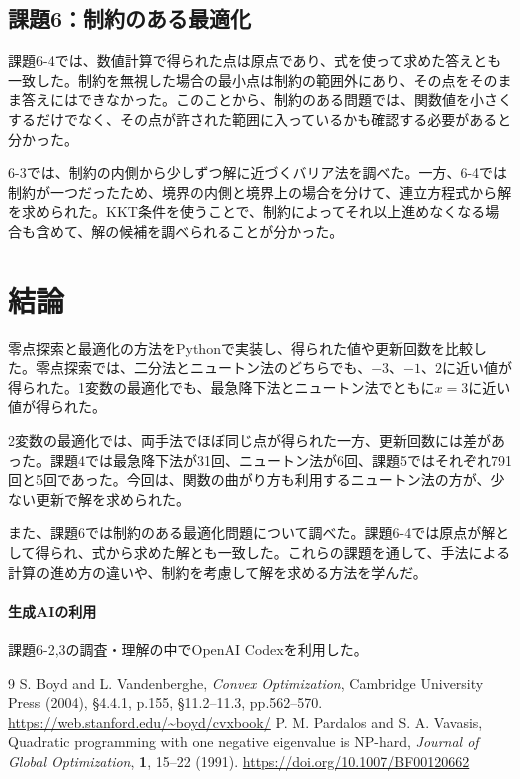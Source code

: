 \documentclass[a4j]{jarticle}
\begin{document}
\subsection{課題6：制約のある最適化}
課題6-4では、数値計算で得られた点は原点であり、式を使って求めた答えとも一致した。制約を無視した場合の最小点は制約の範囲外にあり、その点をそのまま答えにはできなかった。このことから、制約のある問題では、関数値を小さくするだけでなく、その点が許された範囲に入っているかも確認する必要があると分かった。

6-3では、制約の内側から少しずつ解に近づくバリア法を調べた。一方、6-4では制約が一つだったため、境界の内側と境界上の場合を分けて、連立方程式から解を求められた。KKT条件を使うことで、制約によってそれ以上進めなくなる場合も含めて、解の候補を調べられることが分かった。

\clearpage
\section{結論}
零点探索と最適化の方法をPythonで実装し、得られた値や更新回数を比較した。零点探索では、二分法とニュートン法のどちらでも、$-3$、$-1$、$2$に近い値が得られた。1変数の最適化でも、最急降下法とニュートン法でともに$x=3$に近い値が得られた。

2変数の最適化では、両手法でほぼ同じ点が得られた一方、更新回数には差があった。課題4では最急降下法が31回、ニュートン法が6回、課題5ではそれぞれ791回と5回であった。今回は、関数の曲がり方も利用するニュートン法の方が、少ない更新で解を求められた。

また、課題6では制約のある最適化問題について調べた。課題6-4では原点が解として得られ、式から求めた解とも一致した。これらの課題を通して、手法による計算の進め方の違いや、制約を考慮して解を求める方法を学んだ。

\paragraph{生成AIの利用}
課題6-2,3の調査・理解の中でOpenAI Codexを利用した。

\begin{thebibliography}{9}
 S. Boyd and L. Vandenberghe, \textit{Convex Optimization}, Cambridge University Press (2004), \S4.4.1, p.155, \S11.2--11.3, pp.562--570.
\url{https://web.stanford.edu/~boyd/cvxbook/}
 P. M. Pardalos and S. A. Vavasis, Quadratic programming with one negative eigenvalue is NP-hard, \textit{Journal of Global Optimization}, \textbf{1}, 15--22 (1991).
\url{https://doi.org/10.1007/BF00120662}
\end{thebibliography}
\end{document}
